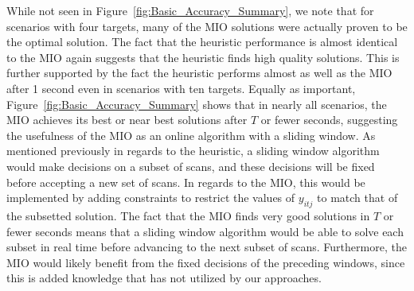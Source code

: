 While not seen in Figure~\ref{fig:Basic_Accuracy_Summary}, we note that for scenarios with four targets, many of the MIO solutions were actually proven to be the optimal solution. The fact that the heuristic performance is almost identical to the MIO again suggests that the heuristic finds high quality solutions. This is further supported by the fact the heuristic performs almost as well as the MIO after 1 second even in scenarios with ten targets. Equally as important, Figure~\ref{fig:Basic_Accuracy_Summary} shows that in nearly all scenarios, the MIO achieves its best or near best solutions after $T$ or fewer seconds, suggesting the usefulness of the MIO as an online algorithm with a sliding window. As mentioned previously in regards to the heuristic, a sliding window algorithm would make decisions on a subset of scans, and these decisions will be fixed before accepting a new set of scans. In regards to the MIO, this would be implemented by adding constraints to restrict the values of $y_{itj}$ to match that of the subsetted solution. The fact that the MIO finds very good solutions in $T$ or fewer seconds means that a sliding window algorithm would be able to solve each subset in real time before advancing to the next subset of scans. Furthermore, the MIO would likely benefit from the fixed decisions of the preceding windows, since this is added knowledge that has not utilized by our approaches.

